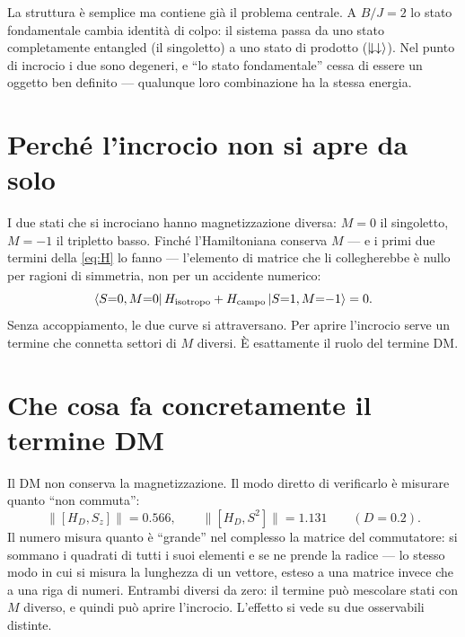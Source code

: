 \documentclass[11pt,a4paper]{article}
\begin{document}
\FloatBarrier

La struttura è semplice ma contiene già il problema centrale. A $B/J=2$ lo stato
fondamentale cambia identità di colpo: il sistema passa da uno stato
completamente entangled (il singoletto) a uno stato di prodotto
($\lvert \!\downarrow\downarrow\rangle$). Nel punto di incrocio i due sono degeneri, e
``lo stato fondamentale'' cessa di essere un oggetto ben definito --- qualunque
loro combinazione ha la stessa energia.


\section{Perché l'incrocio non si apre da solo}

I due stati che si incrociano hanno magnetizzazione diversa: $M=0$ il
singoletto, $M=-1$ il tripletto basso. Finché l'Hamiltoniana conserva $M$ --- e
i primi due termini della \eqref{eq:H} lo fanno --- l'elemento di matrice che li
collegherebbe è nullo per ragioni di simmetria, non per un accidente numerico:
\begin{equation}
\langle S{=}0,M{=}0 \rvert\,H_{\text{isotropo}}+H_{\text{campo}}\,\lvert S{=}1,M{=}{-}1\rangle = 0 .
\end{equation}
Senza accoppiamento, le due curve si attraversano. Per aprire l'incrocio serve
un termine che connetta settori di $M$ diversi. È esattamente il ruolo del
termine DM.

\section{Che cosa fa concretamente il termine DM}

Il DM non conserva la magnetizzazione. Il modo diretto di verificarlo è
misurare quanto ``non commuta'':
\begin{equation}
\lVert [H_D, S_z] \rVert = 0.566, \qquad
\lVert [H_D, S^2] \rVert = 1.131 \qquad (D=0.2).
\end{equation}
Il numero misura quanto è ``grande'' nel complesso la matrice del
commutatore: si sommano i quadrati di tutti i suoi elementi e se ne prende
la radice --- lo stesso modo in cui si misura la lunghezza di un vettore,
esteso a una matrice invece che a una riga di numeri.
Entrambi diversi da zero: il termine può mescolare stati con $M$ diverso, e
quindi può aprire l'incrocio. L'effetto si vede su due osservabili distinte.
\end{document}
